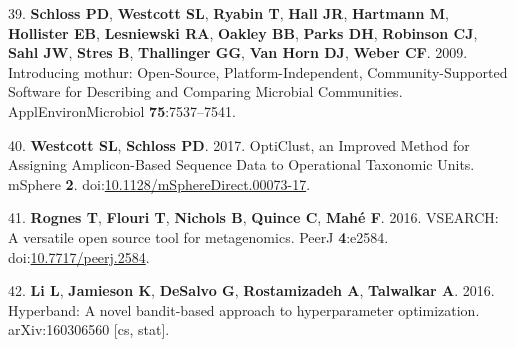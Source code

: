 \documentclass[11pt,]{article}
\begin{document}
\hypertarget{ref-schloss_introducing_2009}{}
39. \textbf{Schloss PD}, \textbf{Westcott SL}, \textbf{Ryabin T},
\textbf{Hall JR}, \textbf{Hartmann M}, \textbf{Hollister EB},
\textbf{Lesniewski RA}, \textbf{Oakley BB}, \textbf{Parks DH},
\textbf{Robinson CJ}, \textbf{Sahl JW}, \textbf{Stres B},
\textbf{Thallinger GG}, \textbf{Van Horn DJ}, \textbf{Weber CF}. 2009.
Introducing mothur: Open-Source, Platform-Independent,
Community-Supported Software for Describing and Comparing Microbial
Communities. ApplEnvironMicrobiol \textbf{75}:7537--7541.

\hypertarget{ref-westcott_opticlust_2017}{}
40. \textbf{Westcott SL}, \textbf{Schloss PD}. 2017. OptiClust, an
Improved Method for Assigning Amplicon-Based Sequence Data to
Operational Taxonomic Units. mSphere \textbf{2}.
doi:\href{https://doi.org/10.1128/mSphereDirect.00073-17}{10.1128/mSphereDirect.00073-17}.

\hypertarget{ref-rognes_vsearch_2016}{}
41. \textbf{Rognes T}, \textbf{Flouri T}, \textbf{Nichols B},
\textbf{Quince C}, \textbf{Mahé F}. 2016. VSEARCH: A versatile open
source tool for metagenomics. PeerJ \textbf{4}:e2584.
doi:\href{https://doi.org/10.7717/peerj.2584}{10.7717/peerj.2584}.

\hypertarget{ref-li_hyperband:_2016}{}
42. \textbf{Li L}, \textbf{Jamieson K}, \textbf{DeSalvo G},
\textbf{Rostamizadeh A}, \textbf{Talwalkar A}. 2016. Hyperband: A novel
bandit-based approach to hyperparameter optimization. arXiv:160306560
{[}cs, stat{]}.
\end{document}
